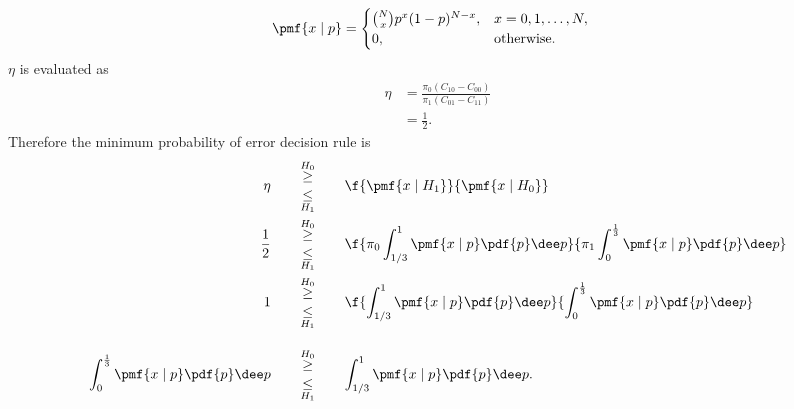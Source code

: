 \begin{example}
    \begin{align}
    \pmf{x \mid p} &= 
    \begin{cases}
        {N \choose x} p^{x}(1-p)^{N-x}, &x = 0, 1, \ldots, N,\\
        0, &\text{otherwise}.
    \end{cases}
    \end{align}
    $\eta$ is evaluated as
    \begin{align}
        \eta &= \frac{\pi_0(C_{10}-C_{00})}{\pi_1(C_{01}-C_{11})} \\
            &= \frac{1}{2}.
    \end{align}
    Therefore the minimum probability of error decision rule is 
    \begin{align}
        \eta\qquad
        {\overset{H_{0}}{\geq}\atop \underset{H_{1}}{\leq}}&\qquad
        \f{\pmf{x\mid H_{1}}}{\pmf{x\mid H_{0}}} \\
        \frac{1}{2}\qquad
        {\overset{H_{0}}{\geq}\atop \underset{H_{1}}{\leq}}&\qquad
        \f{\pi_{0} \int_{1/3}^{1} \pmf{x \mid p}\pdf{p}\dee p}{\pi_{1} \int_{0}^{\frac{1}{3}} \pmf{x \mid p}\pdf{p}\dee p} \\
        1 \qquad
        {\overset{H_{0}}{\geq}\atop \underset{H_{1}}{\leq}}&\qquad
        \f{ \int_{1/3}^{1} \pmf{x \mid p}\pdf{p}\dee p}{ \int_{0}^{\frac{1}{3}} \pmf{x \mid p}\pdf{p}\dee p}\\[10pt]
        { \int_{0}^{\frac{1}{3}} \pmf{x \mid p}\pdf{p}\dee p} \qquad
        {\overset{H_{0}}{\geq}\atop \underset{H_{1}}{\leq}}&\qquad
        { \int_{1/3}^{1} \pmf{x \mid p}\pdf{p}\dee p}.
    \end{align}

    \triqed
\end{example}